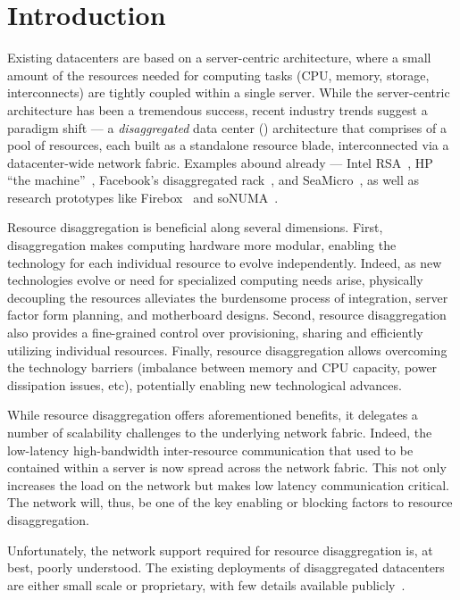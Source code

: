 \vspace{-0.1in}
\section{Introduction}
\vspace{-0.05in}
\label{sec:intro}
Existing datacenters are based on a server-centric architecture, where a small amount of the resources needed for computing tasks (CPU, memory, storage, interconnects) are tightly coupled within a single server. While the server-centric architecture has been a tremendous success, recent industry trends suggest a paradigm shift --- a {\em disaggregated} data center (\dis) architecture that comprises of a pool of resources, each built as a standalone resource blade, interconnected via a datacenter-wide network fabric. Examples abound already --- Intel RSA~\cite{rsa}, HP ``the machine''~\cite{hptm}, Facebook's disaggregated rack~\cite{fdr}, and SeaMicro~\cite{seamicro}, as well as research prototypes like Firebox~\cite{firebox} and soNUMA~\cite{sonuma}.

Resource disaggregation is beneficial along several dimensions. First, disaggregation makes computing hardware more modular, enabling the technology for each individual resource to evolve independently. Indeed, as new technologies evolve or need for specialized computing needs arise, physically decoupling the resources alleviates the burdensome process of integration, server factor form planning, and motherboard designs. Second, resource disaggregation also provides a fine-grained control over provisioning, sharing and efficiently utilizing individual resources. Finally, resource disaggregation allows overcoming the technology barriers (imbalance between memory and CPU capacity, power dissipation issues, etc), potentially enabling new technological advances. 

While resource disaggregation offers aforementioned benefits, it delegates a number of scalability challenges to the underlying network fabric. Indeed, the low-latency high-bandwidth inter-resource communication that used to be contained within a server is now spread across the network fabric. This not only increases the load on the network but makes low latency communication critical. The network will, thus, be one of the key enabling or blocking factors to resource disaggregation. 

Unfortunately, the network support required for resource disaggregation is, at best, poorly understood. The existing deployments of disaggregated datacenters are either small scale or proprietary, with few details available publicly~\cite{rsa, hptm, fdr, seamicro}.

